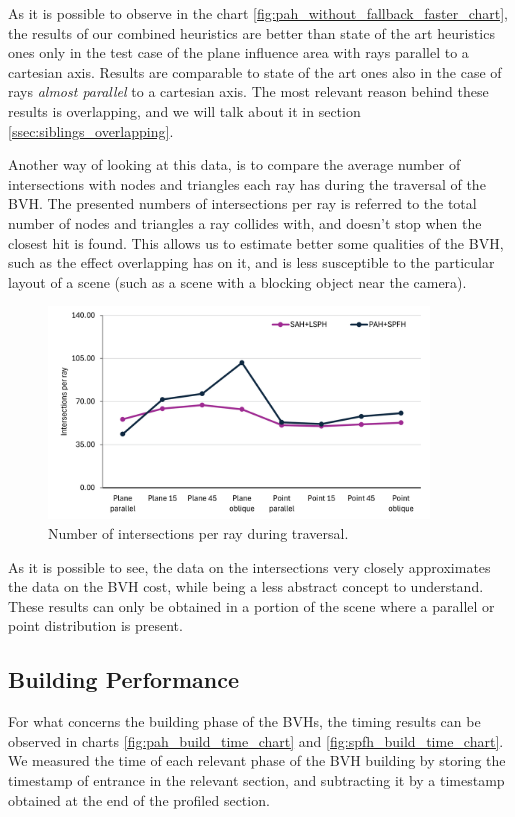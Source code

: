 \documentclass{PoliMi_MasterThesis}
\begin{document}
As it is possible to observe in the chart \ref{fig:pah_without_fallback_faster_chart}, the results of our combined heuristics are better than state of the art heuristics ones only in the test case of the plane influence area with rays parallel to a cartesian axis. Results are comparable to state of the art ones also in the case of rays \textit{almost parallel} to a cartesian axis. The most relevant reason behind these results is overlapping, and we will talk about it in section \ref{ssec:siblings_overlapping}.

Another way of looking at this data, is to compare the average number of intersections with nodes and triangles each ray has during the traversal of the BVH. The presented numbers of intersections per ray is referred to the total number of nodes and triangles a ray collides with, and doesn't stop when the closest hit is found. This allows us to estimate better some qualities of the BVH, such as the effect overlapping has on it, and is less susceptible to the particular layout of a scene (such as a scene with a blocking object near the camera).

\begin{figure}[H] 
	\centering
	\includegraphics[width=0.9\textwidth]{Images/pah_without_fallback_faster_intersections_chart.png}
	\caption{Number of intersections per ray during traversal.}
	\label{fig:pah_without_fallback_faster_intersections_chart}
\end{figure}

As it is possible to see, the data on the intersections very closely approximates the data on the BVH cost, while being a less abstract concept to understand. These results can only be obtained in a portion of the scene where a parallel or point distribution is present.

\subsection{Building Performance} \label{ssec:building_performance}
For what concerns the building phase of the BVHs, the timing results can be observed in charts \ref{fig:pah_build_time_chart} and \ref{fig:spfh_build_time_chart}. We measured the time of each relevant phase of the BVH building by storing the timestamp of entrance in the relevant section, and subtracting it by a timestamp obtained at the end of the profiled section.
\end{document}
